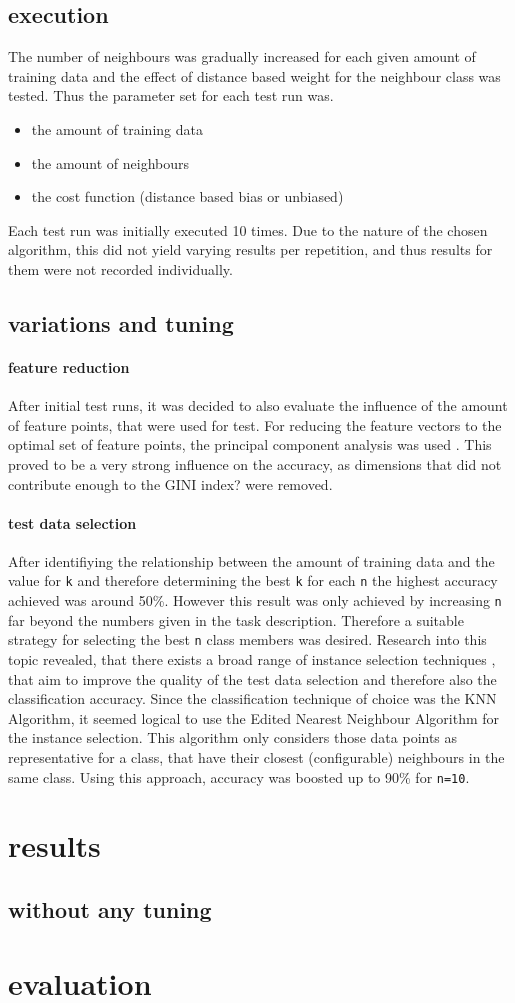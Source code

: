 \documentclass[10pt,a4paper]{proc}
\begin{document}
\subsection*{execution}
The number of neighbours was gradually increased for each given amount of training data and the effect of distance based weight for the neighbour class was tested. Thus the parameter set for each test run was.
\begin{itemize}
\item the amount of training data
\item the amount of neighbours
\item the cost function (distance based bias or unbiased)
\end{itemize}
Each test run was initially executed 10 times. Due to the nature of the chosen algorithm, this did not yield varying results per repetition, and thus results for them were not recorded individually.
\subsection{variations and tuning}\label{substune}
\paragraph*{feature reduction}
After initial test runs, it was decided to also evaluate the influence of the amount of feature points, that were used for test. For reducing the feature vectors to the optimal set of feature points, the principal component analysis was used \cite{wold1987principal}. This proved to be a very strong influence on the accuracy, as dimensions that did not contribute enough to the GINI index? were removed.
\paragraph*{test data selection}
After identifiying the relationship between the amount of training data and the value for \texttt{k} and therefore determining the best \texttt{k} for each \texttt{n} the highest accuracy achieved was around 50\%. However this result was only achieved by increasing \texttt{n} far beyond the numbers given in the task description. Therefore a suitable strategy for selecting the best \texttt{n} class members was desired. Research into this topic revealed, that there exists a broad range of instance selection techniques \cite{arnaiz2018estudio}, that aim to improve the quality of the test data selection and therefore also the classification accuracy. Since the classification technique of choice was the KNN Algorithm, it seemed logical to use the Edited Nearest Neighbour Algorithm for the instance selection. This algorithm only considers those data points as representative for a class, that have their closest (configurable) neighbours in the same class. Using this approach, accuracy was boosted up to 90\% for \texttt{n=10}.
\onecolumn
\section{results}
\subsection*{without any tuning}
\twocolumn
\section{evaluation}


\end{document}
